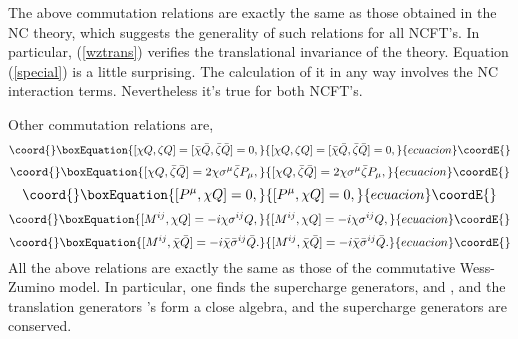 \documentclass[a4paper,a4paper]{article}
\begin{document}
The above commutation relations are exactly the same as those obtained in the NC 
\coordHE{} theory, which suggests the generality of such relations for all NCFT's. 
In particular, (\ref{wztrans}) verifies the translational invariance
of the theory. Equation (\ref{special}) is a little surprising. The calculation of
it in any way involves the NC interaction terms. Nevertheless it's 
true for both NCFT's.

Other commutation relations are,
\begin{equation}\coord{}\boxEquation{
[\chi Q,\zeta Q] = [\bar{\chi} \bar{Q},\bar{\zeta} \bar{Q}] = 0,\label{QQ}
}{
[\chi Q,\zeta Q] = [\bar{\chi} \bar{Q},\bar{\zeta} \bar{Q}] = 0,}{ecuacion}\coordE{}\end{equation}
\begin{equation}\coord{}\boxEquation{
[\chi Q,\bar{\zeta} \bar{Q}] = 2\chi\sigma^\mu\bar{\zeta}P_\mu,\label{QQbar}
}{
[\chi Q,\bar{\zeta} \bar{Q}] = 2\chi\sigma^\mu\bar{\zeta}P_\mu,}{ecuacion}\coordE{}\end{equation}
\begin{equation}\coord{}\boxEquation{
[P^\mu, \chi Q] = 0,\label{PQ}
}{
[P^\mu, \chi Q] = 0,}{ecuacion}\coordE{}\end{equation}
\begin{equation}\coord{}\boxEquation{
[M^{ij}, \chi Q] = -i\chi \sigma^{ij}Q,
}{
[M^{ij}, \chi Q] = -i\chi \sigma^{ij}Q,
}{ecuacion}\coordE{}\end{equation}
\begin{equation}\coord{}\boxEquation{
[M^{ij}, \bar{\chi} \bar{Q}] = -i\bar{\chi} \bar{\sigma}^{ij}\bar{Q}.
}{
[M^{ij}, \bar{\chi} \bar{Q}] = -i\bar{\chi} \bar{\sigma}^{ij}\bar{Q}.
}{ecuacion}\coordE{}\end{equation}
All the above relations are exactly the same as 
those of the commutative Wess-Zumino model. In particular, one 
finds the supercharge generators, \coordHE{} and \coordHE{}, and the translation
generators \coordHE{}'s form a close algebra, and the supercharge generators 
are conserved. 
\end{document}
